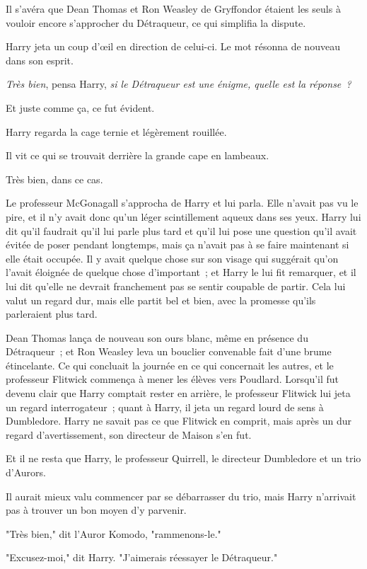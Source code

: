 Il s'avéra que Dean Thomas et Ron Weasley de Gryffondor étaient les seuls à vouloir encore s'approcher du Détraqueur, ce qui simplifia la dispute.

Harry jeta un coup d'œil en direction de celui-ci. Le mot résonna de nouveau dans son esprit.

\emph{Très bien}, pensa Harry, \emph{si le Détraqueur est une énigme, quelle est la réponse~?}

Et juste comme ça, ce fut évident.

Harry regarda la cage ternie et légèrement rouillée.

Il vit ce qui se trouvait derrière la grande cape en lambeaux.

Très bien, dans ce cas.

Le professeur McGonagall s'approcha de Harry et lui parla. Elle n'avait pas vu le pire, et il n'y avait donc qu'un léger scintillement aqueux dans ses yeux. Harry lui dit qu'il faudrait qu'il lui parle plus tard et qu'il lui pose une question qu'il avait évitée de poser pendant longtemps, mais ça n'avait pas à se faire maintenant si elle était occupée. Il y avait quelque chose sur son visage qui suggérait qu'on l'avait éloignée de quelque chose d'important~; et Harry le lui fit remarquer, et il lui dit qu'elle ne devrait franchement pas se sentir coupable de partir. Cela lui valut un regard dur, mais elle partit bel et bien, avec la promesse qu'ils parleraient plus tard.

Dean Thomas lança de nouveau son ours blanc, même en présence du Détraqueur~; et Ron Weasley leva un bouclier convenable fait d'une brume étincelante. Ce qui concluait la journée en ce qui concernait les autres, et le professeur Flitwick commença à mener les élèves vers Poudlard. Lorsqu'il fut devenu clair que Harry comptait rester en arrière, le professeur Flitwick lui jeta un regard interrogateur~; quant à Harry, il jeta un regard lourd de sens à Dumbledore. Harry ne savait pas ce que Flitwick en comprit, mais après un dur regard d'avertissement, son directeur de Maison s'en fut.

Et il ne resta que Harry, le professeur Quirrell, le directeur Dumbledore et un trio d'Aurors.

Il aurait mieux valu commencer par se débarrasser du trio, mais Harry n'arrivait pas à trouver un bon moyen d'y parvenir.

"Très bien," dit l'Auror Komodo, "rammenons-le."

"Excusez-moi," dit Harry. "J'aimerais réessayer le Détraqueur."

